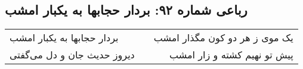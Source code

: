\begin{center}
\section*{رباعی شماره ۹۲: بردار حجابها به یکبار امشب}
\label{sec:0092}
\begin{longtable}{l p{0.5cm} r}
بردار حجابها به یکبار امشب
&&
یک موی ز هر دو کون مگذار امشب
\\
دیروز حدیث جان و دل می‌گفتی
&&
پیش تو نهیم کشته و زار امشب
\\
\end{longtable}
\end{center}
